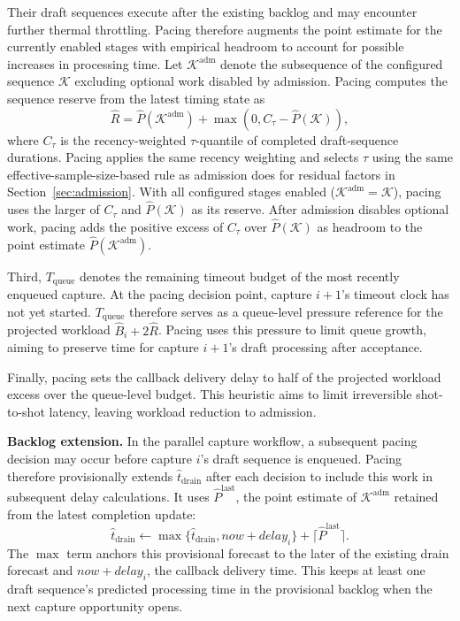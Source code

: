 Their draft sequences execute after the existing backlog and may encounter further thermal throttling.
Pacing therefore augments the point estimate for the currently enabled stages with empirical headroom to account for possible increases in processing time.
Let \(\mathcal K^{\mathrm{adm}}\) denote the subsequence of the configured sequence \(\mathcal K\) excluding optional work disabled by admission.
Pacing computes the sequence reserve from the latest timing state as
\begin{equation}
  \hat R
  =
  \hat P(\mathcal K^{\mathrm{adm}})
  +
  \max\!\left(0,C_\tau-\hat P(\mathcal K)\right),
  \label{eq:reserve}
\end{equation}
where \(C_\tau\) is the recency-weighted \(\tau\)-quantile of completed draft-sequence durations.
Pacing applies the same recency weighting and selects \(\tau\) using the same effective-sample-size-based rule as admission does for residual factors in Section~\ref{sec:admission}.
With all configured stages enabled (\(\mathcal K^{\mathrm{adm}}=\mathcal K\)), pacing uses the larger of \(C_\tau\) and \(\hat P(\mathcal K)\) as its reserve.
After admission disables optional work, pacing adds the positive excess of \(C_\tau\) over \(\hat P(\mathcal K)\) as headroom to the point estimate \(\hat P(\mathcal K^{\mathrm{adm}})\).

Third, \(T_{\mathrm{queue}}\) denotes the remaining timeout budget of the most recently enqueued capture.
At the pacing decision point, capture \(i+1\)'s timeout clock has not yet started.
\(T_{\mathrm{queue}}\) therefore serves as a queue-level pressure reference for the projected workload \(\hat B_i+2\hat R\).
Pacing uses this pressure to limit queue growth, aiming to preserve time for capture \(i+1\)'s draft processing after acceptance.

Finally, pacing sets the callback delivery delay to half of the projected workload excess over the queue-level budget.
This heuristic aims to limit irreversible shot-to-shot latency, leaving workload reduction to admission.

\smallskip\noindent\textbf{Backlog extension.}
In the parallel capture workflow, a subsequent pacing decision may occur before capture \(i\)'s draft sequence is enqueued.
Pacing therefore provisionally extends \(\hat t_{\mathrm{drain}}\) after each decision to include this work in subsequent delay calculations.
It uses \(\hat P^{\mathrm{last}}\), the point estimate of \(\mathcal K^{\mathrm{adm}}\) retained from the latest completion update:
\begin{equation}
  \hat t_{\mathrm{drain}}
  \gets
  \max\{\hat t_{\mathrm{drain}},\mathit{now}+\mathit{delay}_i\}
  +\lceil\hat P^{\mathrm{last}}\rceil.
  \label{eq:clock-update}
\end{equation}
The \(\max\) term anchors this provisional forecast to the later of the existing drain forecast and \(\mathit{now}+\mathit{delay}_i\), the callback delivery time.
This keeps at least one draft sequence's predicted processing time in the provisional backlog when the next capture opportunity opens.

